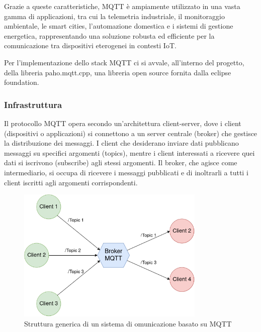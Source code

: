\noindent Grazie a queste caratteristiche, MQTT è ampiamente utilizzato in una vasta gamma di applicazioni, tra cui la telemetria industriale, il monitoraggio ambientale, le smart cities, l'automazione domestica e i sistemi di gestione energetica, rappresentando una soluzione robusta ed efficiente per la comunicazione tra dispositivi eterogenei in contesti IoT.

\noindent Per l'implementazione dello stack MQTT ci si avvale, all'interno del progetto, della libreria paho.mqtt.cpp\cite{paho_cpp}, una libreria open source fornita dalla eclipse foundation.

\subsubsection{Infrastruttura}
\noindent Il protocollo MQTT opera secondo un'architettura client-server, dove i client (dispositivi o applicazioni) si connettono a un server centrale (broker) che gestisce la distribuzione dei messaggi. I client che desiderano inviare dati pubblicano messaggi su specifici argomenti (topics), mentre i client interessati a ricevere quei dati si iscrivono (subscribe) agli stessi argomenti. Il broker, che agisce come intermediario, si occupa di ricevere i messaggi pubblicati e di inoltrarli a tutti i client iscritti agli argomenti corrispondenti.

\begin{figure}[H]
  \centering
  \includegraphics[width=0.8\textwidth]{figures/mqtt_structure.png}
  \caption{Struttura generica di un sistema di omunicazione basato su MQTT}
  \label{mqtt_structure}
\end{figure}

